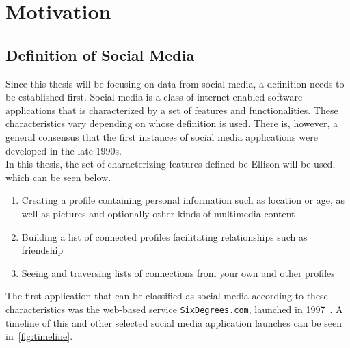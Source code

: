 
\chapter{Motivation}
\label{ch:motivation}

\section{Definition of Social Media}
\label{sec:definitionOfSocialMedia}

Since this thesis will be focusing on data from social media, a definition needs to be established first.
Social media is a class of internet-enabled software applications that is characterized by a set of features and functionalities.
These characteristics vary depending on whose definition is used.
There is, however, a general consensus that the first instances of social media applications were developed in the late 1990s.
\\
In this thesis, the set of characterizing features defined be Ellison \etAl \cite{Ellison2008} will be used, which can be seen below.

\begin{enumerate}
    \item
    Creating a profile containing personal information such as location or age, as well as pictures and optionally other kinds of multimedia content
    \item
    Building a list of connected profiles facilitating relationships such as friendship
    \item
    Seeing and traversing lists of connections from your own and other profiles
\end{enumerate}


The first application that can be classified as social media according to these characteristics
was the web-based service \texttt{SixDegrees.com}, launched in 1997~\cite{Ellison2008}.
A timeline of this and other selected social media application launches can be seen in~\cref{fig:timeline}.

